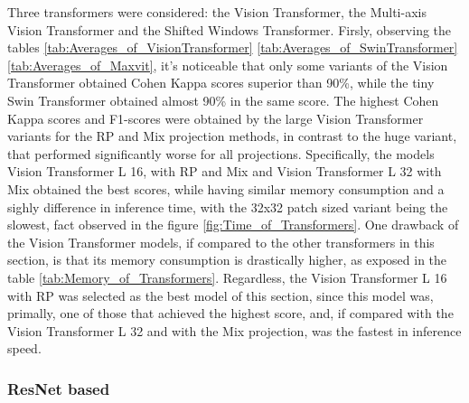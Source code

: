 


\pagebreak

Three transformers were considered: the Vision Transformer, the Multi-axis Vision Transformer and the Shifted Windows Transformer. Firsly, observing the tables \ref{tab:Averages_of_VisionTransformer} \ref{tab:Averages_of_SwinTransformer} \ref{tab:Averages_of_Maxvit}, it's noticeable that only some variants of the Vision Transformer obtained Cohen Kappa scores superior than 90\%, while the tiny Swin Transformer obtained almost 90\% in the same score. The highest Cohen Kappa scores and F1-scores were obtained by the large Vision Transformer variants for the \acrshort{RP} and \acrshort{Mix} projection methods, in contrast to the huge variant, that performed significantly worse for all projections. Specifically, the models Vision Transformer L 16, with \acrshort{RP} and \acrshort{Mix} and Vision Transformer L 32 with \acrshort{Mix} obtained the best scores, while having similar memory consumption and a sighly difference in inference time, with the 32x32 patch sized variant being the slowest, fact observed in the figure \ref{fig:Time_of_Transformers}. One drawback of the Vision Transformer models, if compared to the other transformers in this section, is that its memory consumption is drastically higher, as exposed in the table \ref{tab:Memory_of_Transformers}. Regardless, the Vision Transformer L 16 with \acrshort{RP} was selected as the best model of this section, since this model was, primally, one of those that achieved the highest score, and, if compared with the Vision Transformer L 32 and with the \acrshort{Mix} projection, was the fastest in inference speed.

\pagebreak

\subsubsection{ResNet based}


%




\pagebreak

